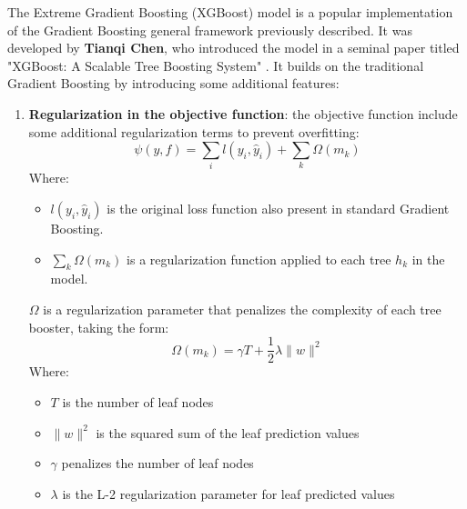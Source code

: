 The Extreme Gradient Boosting (XGBoost) model is a popular implementation of the Gradient Boosting general framework previously described. It was developed by \textbf{Tianqi Chen}, who introduced the model in a seminal paper titled "XGBoost: A Scalable Tree Boosting System" \cite{chen2016xgboost}. It builds on the traditional Gradient Boosting by introducing some additional features:
\begin{enumerate}
    \item \textbf{Regularization in the objective function}: the objective function include some additional regularization terms to prevent overfitting: 
    \[
    \psi(y, f) = \sum_{i} l(y_i, \hat{y}_i) + \sum_{k} \Omega(m_k)
    \]
    Where: 
    \begin{itemize}
        \addtolength{\leftskip}{2em}
        \item $l(y_i, \hat{y}_i)$ is the original loss function also present in standard Gradient Boosting.
        \item $\sum_{k} \Omega(m_k)$ is a regularization function applied to each tree $h_k$ in the model.
    \end{itemize}

    $\Omega$ is a regularization parameter that penalizes the complexity of each tree booster, taking the form:
    \[
    \Omega(m_k) = \gamma T + \frac{1}{2} \lambda \|w\|^2
    \]
    Where: 
    \begin{itemize}
        \addtolength{\leftskip}{2em}
        \item $T$ is the number of leaf nodes
        \item $\|w\|^2$ is the squared sum of the leaf prediction values
        \item $\gamma$ penalizes the number of leaf nodes
        \item $\lambda$ is the L-2 regularization parameter for leaf predicted values
    \end{itemize}


\end{enumerate}
